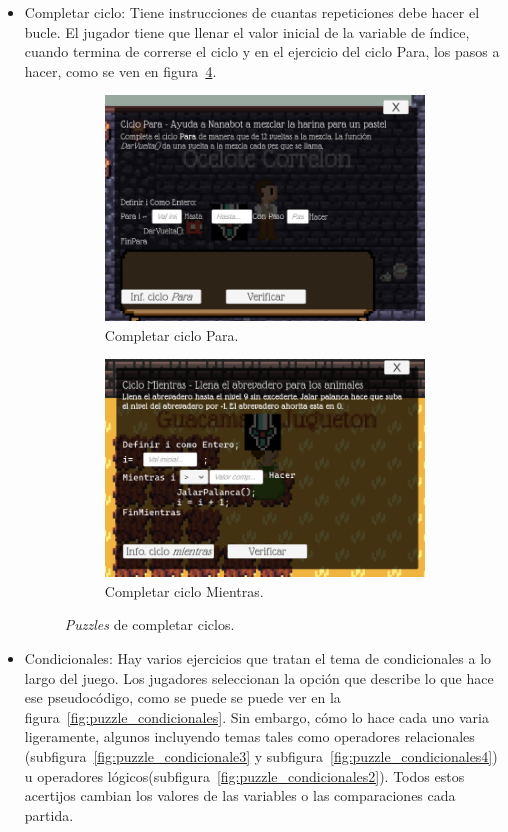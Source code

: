 \begin{itemize}
\begin{figure}[H]
        \label{fig:puzzle_opcion_multiple}
    \end{figure}
    \item Completar ciclo: Tiene instrucciones de cuantas repeticiones debe hacer el bucle. El jugador tiene que llenar el valor inicial de la variable de índice, cuando termina de correrse el ciclo y en el ejercicio del ciclo Para, los pasos a hacer, como se ven en figura~\ref{fig:puzzle_completar_ciclos}.
    \begin{figure}[H]
        \begin{subfigure}{\textwidth}
            \centering
            \includegraphics[width=0.5\linewidth]{images/CompletarCicloFor.png}
            \caption{Completar ciclo Para.}
            \label{fig:puzzle_completar_ciclos_for}
        \end{subfigure}
        \begin{subfigure}{\textwidth}
            \centering
            \includegraphics[width=0.5\linewidth]{images/CompletarCicloWhile.png}
            \caption{Completar ciclo Mientras.}
            \label{fig:puzzle_completar_ciclos_while}
        \end{subfigure}
        \caption{\textit{Puzzles} de completar ciclos.}
        \label{fig:puzzle_completar_ciclos}
    \end{figure}
    \item Condicionales: Hay varios ejercicios que tratan el tema de condicionales a lo largo del juego. Los jugadores seleccionan la opción que describe lo que hace ese pseudocódigo, como se puede se puede ver en la figura~\ref{fig:puzzle_condicionales}. Sin embargo, cómo lo hace cada uno varia ligeramente, algunos incluyendo temas tales como operadores relacionales (subfigura~\ref{fig:puzzle_condicionale3} y subfigura~\ref{fig:puzzle_condicionales4}) u operadores lógicos(subfigura~\ref{fig:puzzle_condicionales2}). Todos estos acertijos cambian los valores de las variables o las comparaciones cada partida.

\end{itemize}

